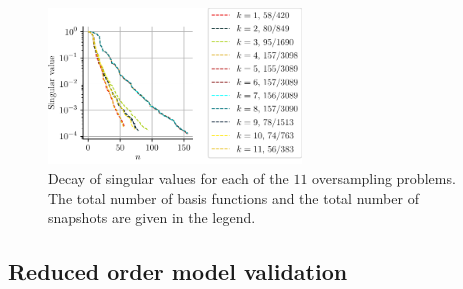 \documentclass[a4paper]{eccomas_paper-2024}
\begin{document}
\begin{figure}
    \begin{center}
        \includegraphics[width=0.6\textwidth]{singular_values.pdf}
    \end{center}
    \caption{Decay of singular values for each of the $11$ oversampling problems. The total number of basis functions and the total number of snapshots are given in the legend.}\label{fig:singular_values}
\end{figure}


\subsection{Reduced order model validation} %
\label{sub:Reduced order model validation}
\end{document}
